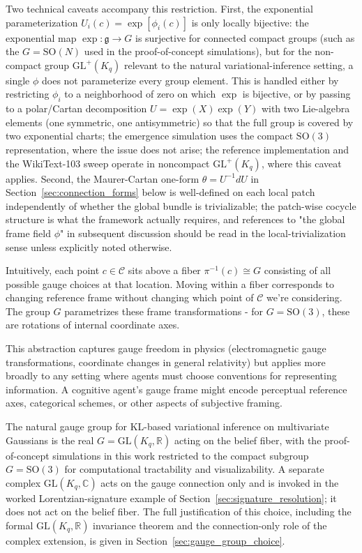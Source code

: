 \documentclass[11pt]{article}
\begin{document}
Two technical caveats accompany this restriction. First, the exponential parameterization $U_i(c) = \exp[\phi_i(c)]$ is only locally bijective: the exponential map $\exp: \mathfrak{g} \to G$ is surjective for connected compact groups (such as the $G = \mathrm{SO}(N)$ used in the proof-of-concept simulations), but for the non-compact group $\mathrm{GL}^+(K_q)$ relevant to the natural variational-inference setting, a single $\phi$ does not parameterize every group element. This is handled either by restricting $\phi_i$ to a neighborhood of zero on which $\exp$ is bijective, or by passing to a polar/Cartan decomposition $U = \exp(X)\exp(Y)$ with two Lie-algebra elements (one symmetric, one antisymmetric) so that the full group is covered by two exponential charts; the emergence simulation uses the compact $\mathrm{SO}(3)$ representation, where the issue does not arise; the reference implementation and the WikiText-103 sweep operate in noncompact $\mathrm{GL}^+(K_q)$, where this caveat applies. Second, the Maurer-Cartan one-form $\theta = U^{-1}dU$ in Section~\ref{sec:connection_forms} below is well-defined on each local patch independently of whether the global bundle is trivializable; the patch-wise cocycle structure is what the framework actually requires, and references to "the global frame field $\phi$" in subsequent discussion should be read in the local-trivialization sense unless explicitly noted otherwise.

Intuitively, each point $c \in \mathcal{C}$ sits above a fiber $\pi^{-1}(c) \cong G$ consisting of all possible gauge choices at that location. Moving within a fiber corresponds to changing reference frame without changing which point of $\mathcal{C}$ we're considering. The group $G$ parametrizes these frame transformations - for $G = \mathrm{SO}(3)$, these are rotations of internal coordinate axes.

This abstraction captures gauge freedom in physics (electromagnetic gauge transformations, coordinate changes in general relativity) but applies more broadly to any setting where agents must choose conventions for representing information. A cognitive agent's gauge frame might encode perceptual reference axes, categorical schemes, or other aspects of subjective framing.

The natural gauge group for KL-based variational inference on multivariate Gaussians is the real $G = \mathrm{GL}(K_q, \mathbb{R})$ acting on the belief fiber, with the proof-of-concept simulations in this work restricted to the compact subgroup $G = \mathrm{SO}(3)$ for computational tractability and visualizability. A separate complex $\mathrm{GL}(K_q, \mathbb{C})$ acts on the gauge connection only and is invoked in the worked Lorentzian-signature example of Section~\ref{sec:signature_resolution}; it does not act on the belief fiber. The full justification of this choice, including the formal $\mathrm{GL}(K_q, \mathbb{R})$ invariance theorem and the connection-only role of the complex extension, is given in Section~\ref{sec:gauge_group_choice}.
\end{document}
